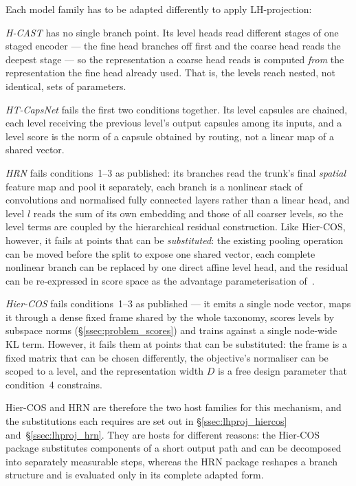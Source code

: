 Each model family has to be adapted differently to apply LH-projection:

\emph{H-CAST} has no single branch point. Its level heads read different stages of
one staged encoder --- the fine head branches off first and the coarse head reads
the deepest stage --- so the representation a coarse head reads is computed
\emph{from} the representation the fine head already used. That is, the levels reach nested,
not identical, sets of parameters.

\emph{HT-CapsNet} fails the first two conditions together. Its level capsules are
chained, each level receiving the previous level's output capsules among its
inputs, and a level score is the norm of a capsule obtained by routing, not a
linear map of a shared vector.

\emph{HRN} fails conditions~1--3 as published: its branches read the trunk's
final \emph{spatial} feature map and pool it separately, each branch is a
nonlinear stack of convolutions and normalised fully connected layers rather than
a linear head, and level $l$ reads the sum of its own embedding and those of all
coarser levels, so the level terms are coupled by the hierarchical residual
construction. Like Hier-COS, however, it fails at points that can be
\emph{substituted}: the existing pooling operation can be
moved before the split to expose one shared vector, each complete nonlinear
branch can be replaced by one direct affine level head, and the residual can be
re-expressed in score space as the advantage parameterisation
of~\cite{fiaschi2024informed}.

\emph{Hier-COS} fails conditions~1--3 as published --- it emits a single node
vector, maps it through a dense fixed frame shared by the whole taxonomy, scores
levels by subspace norms (\S\ref{ssec:problem_scores}) and trains against a single
node-wide KL term. However, it fails them at points that can be substituted: the frame is a fixed matrix that can be chosen differently,
the objective's normaliser can be scoped to a level, and the representation width
$D$ is a free design parameter that condition~4 constrains.

Hier-COS and HRN are therefore the two host families for this mechanism, and the
substitutions each requires are set out in \S\ref{ssec:lhproj_hiercos}
and~\S\ref{ssec:lhproj_hrn}. They are hosts for different reasons: the Hier-COS
package substitutes components of a short output path and can be decomposed into
separately measurable steps, whereas the HRN package reshapes a branch structure
and is evaluated only in its complete adapted form.

